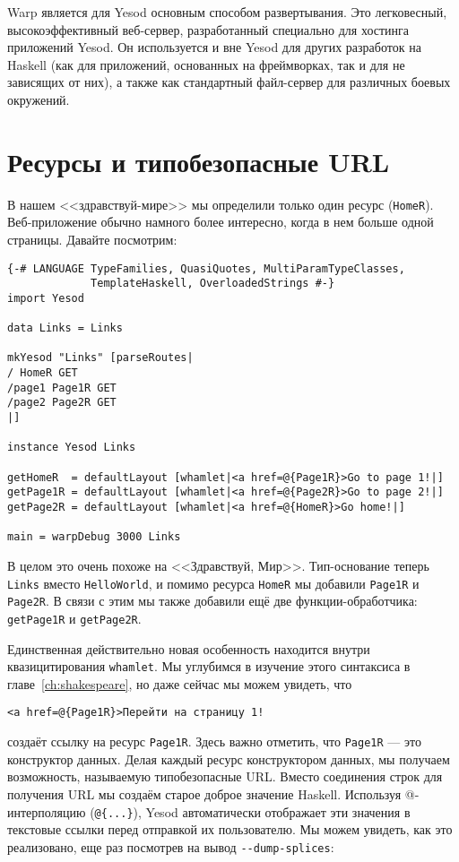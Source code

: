 Warp является для Yesod основным способом развертывания. Это легковесный,
высокоэффективный веб-сервер, разработанный специально для хостинга приложений Yesod. Он
используется и вне Yesod для других разработок на Haskell (как для приложений, основанных
на фреймворках, так и для не зависящих от них), а также как стандартный файл-сервер для
различных боевых окружений.

\section{Ресурсы и типобезопасные URL}

В нашем <<здравствуй-мире>> мы определили только один ресурс
(\lstinline!HomeR!). Веб-приложение обычно намного более интересно, когда в нем больше
одной страницы. Давайте посмотрим:

\begin{lstlisting}
{-# LANGUAGE TypeFamilies, QuasiQuotes, MultiParamTypeClasses,
             TemplateHaskell, OverloadedStrings #-}
import Yesod

data Links = Links

mkYesod "Links" [parseRoutes|
/ HomeR GET
/page1 Page1R GET
/page2 Page2R GET
|]

instance Yesod Links

getHomeR  = defaultLayout [whamlet|<a href=@{Page1R}>Go to page 1!|]
getPage1R = defaultLayout [whamlet|<a href=@{Page2R}>Go to page 2!|]
getPage2R = defaultLayout [whamlet|<a href=@{HomeR}>Go home!|]

main = warpDebug 3000 Links
\end{lstlisting}

В целом это очень похоже на <<Здравствуй, Мир>>. Тип-основание теперь \lstinline!Links!
вместо \lstinline!HelloWorld!, и помимо ресурса \lstinline!HomeR! мы добавили
\lstinline!Page1R! и \lstinline!Page2R!. В связи с этим мы также добавили ещё две
функции-обработчика: \lstinline!getPage1R! и \lstinline!getPage2R!.

Единственная действительно новая особенность находится внутри квазицитирования
\lstinline'whamlet'. Мы углубимся в изучение этого синтаксиса в
главе~\ref{ch:shakespeare}, но даже сейчас мы можем увидеть, что

\begin{lstlisting}
<a href=@{Page1R}>Перейти на страницу 1!
\end{lstlisting}
создаёт ссылку на ресурс \lstinline!Page1R!. Здесь важно отметить, что \lstinline!Page1R!
--- это конструктор данных. Делая каждый ресурс конструктором данных, мы получаем
возможность, называемую типобезопасные URL. Вместо соединения строк для получения URL мы
создаём старое доброе значение Haskell. Используя @-интерполяцию (\lstinline!@{...}!),
Yesod автоматически отображает эти значения в текстовые ссылки перед отправкой их
пользователю. Мы можем увидеть, как это реализовано, еще раз посмотрев на вывод
\lstinline!--dump-splices!:

